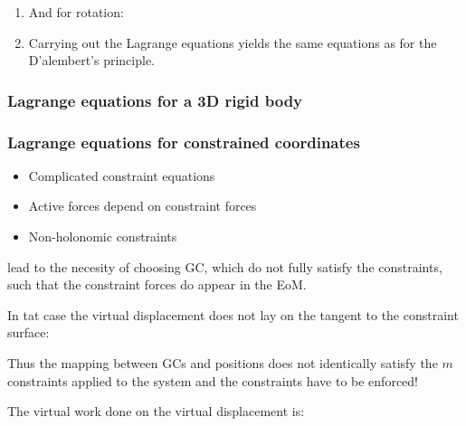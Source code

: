 \documentclass[10pt,a4paper]{scrartcl}
\begin{document}
\begin{multicols*}{2}
\begin{enumerate}

\item And for rotation:

\item Carrying out the Lagrange equations yields the same equations as for the D'alembert's principle.
\end{enumerate}

\subsubsection{Lagrange equations for a 3D rigid body}



\subsubsection{Lagrange equations for constrained coordinates}

\begin{itemize}
\item Complicated constraint equations
\item Active forces depend on constraint forces
\item Non-holonomic constraints
\end{itemize}

lead to the necesity of choosing GC, which do not fully satisfy the constraints, such that the constraint forces do appear in the EoM.

In tat case the virtual displacement does not lay on the tangent to the constraint surface:


Thus the mapping between GCs and positions does not identically satisfy the $m$ constraints applied to the system and the constraints have to be enforced!


The virtual work done on the virtual displacement is:



\end{multicols*}
\end{document}
